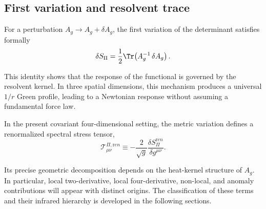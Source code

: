 \subsection{First variation and resolvent trace}
\label{subsec:first-variation}

For a perturbation $A_g \to A_g + \delta A_g$, the first variation of the determinant satisfies formally
\begin{equation}
  \delta S_\Pi
  =
  \frac12 \Tr\!\left(A_g^{-1}\,\delta A_g\right) .
\end{equation}

This identity shows that the response of the functional is governed by the resolvent kernel.
In three spatial dimensions, this mechanism produces a universal $1/r$ Green profile, leading to a Newtonian response without assuming a fundamental force law.

In the present covariant four-dimensional setting, the metric variation defines a renormalized spectral stress tensor,
\begin{equation}
  \mathcal{T}^{\Pi,{\mathrm ren}}_{\mu\nu}
  \equiv
  -\frac{2}{\sqrt{g}}
  \frac{\delta S_\Pi^{\mathrm ren}}{\delta g^{\mu\nu}} .
\end{equation}

Its precise geometric decomposition depends on the heat-kernel structure of $A_g$.
In particular, local two-derivative, local four-derivative, non-local, and anomaly contributions will appear with distinct origins.
The classification of these terms and their infrared hierarchy is developed in the following sections.
